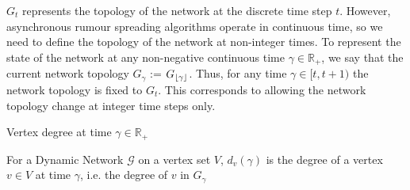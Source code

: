 $G_t$ represents the topology of the network at the discrete time step $t$. However, asynchronous rumour spreading algorithms operate in continuous time, so we need to define the topology of the network at non-integer times. To represent the state of the network at any non-negative continuous time $\gamma \in \mathbb{R}_+$, we say that the current network topology $G_\gamma$ := $G_{\lfloor\gamma\rfloor}$. Thus, for any time $\gamma \in [t, t + 1)$ the network topology is fixed to $G_t$. This corresponds to allowing the network topology change at integer time steps only.


\begin{definition}
	Vertex degree at time $\gamma \in \mathbb{R}_+ $ 

	\noindent
	For a Dynamic Network $\mathcal{G}$ on a vertex set $V$, $d_v(\gamma)$ is the degree of a vertex $v \in V$ at time $\gamma$, i.e. the degree of $v$ in $G_\gamma$
\end{definition}





